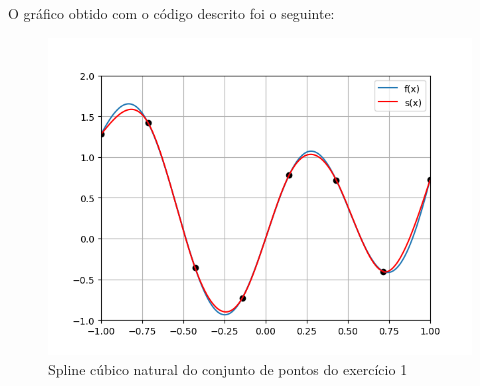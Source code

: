 \documentclass[12pt, letterpaper,fleqn]{article}
\begin{document}
\begin{itemize}
    O gráfico obtido com o código descrito foi o seguinte:
    \begin{figure}
        \includegraphics[width=\linewidth]{ex1-spline.png}
        \caption{Spline cúbico natural do conjunto de pontos do exercício 1}
        \label{fig:spline1}
    \end{figure}
\end{itemize}
\end{document}
